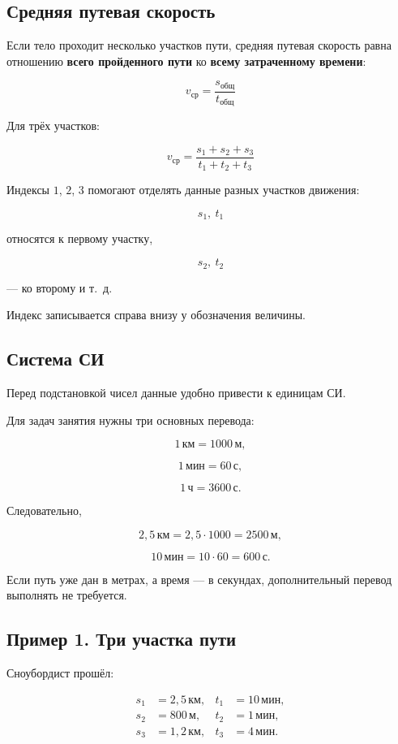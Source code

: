 \documentclass[a4paper,12pt]{article}
\newcommand{\avgv}{v_{\text{ср}}}
\newcommand{\unit}[1]{\,\text{#1}}
\begin{document}
\subsection*{Средняя путевая скорость}

Если тело проходит несколько участков пути, средняя путевая скорость равна отношению
\textbf{всего пройденного пути} ко \textbf{всему затраченному времени}:

\[
\boxed{
\avgv=
\frac{s_{\text{общ}}}{t_{\text{общ}}}
}
\]

Для трёх участков:

\[
\boxed{
\avgv=
\frac{s_1+s_2+s_3}
     {t_1+t_2+t_3}
}
\]

Индексы $1$, $2$, $3$ помогают отделять данные разных участков движения:

\[
s_1,\ t_1
\]

относятся к первому участку,

\[
s_2,\ t_2
\]

--- ко второму и т.~д.

Индекс записывается справа внизу у обозначения величины.

\subsection*{Система СИ}

Перед подстановкой чисел данные удобно привести к единицам СИ.

Для задач занятия нужны три основных перевода:

\[
1\unit{км}=1000\unit{м},
\]

\[
1\unit{мин}=60\unit{с},
\]

\[
1\unit{ч}=3600\unit{с}.
\]

Следовательно,

\[
2{,}5\unit{км}
=
2{,}5\cdot1000
=
2500\unit{м},
\]

\[
10\unit{мин}
=
10\cdot60
=
600\unit{с}.
\]

Если путь уже дан в метрах, а время --- в секундах, дополнительный перевод выполнять не требуется.

\subsection*{Пример 1. Три участка пути}

Сноубордист прошёл:

\[
\begin{aligned}
s_1&=2{,}5\unit{км},
&
t_1&=10\unit{мин},
\\
s_2&=800\unit{м},
&
t_2&=1\unit{мин},
\\
s_3&=1{,}2\unit{км},
&
t_3&=4\unit{мин}.
\end{aligned}
\]
\end{document}
